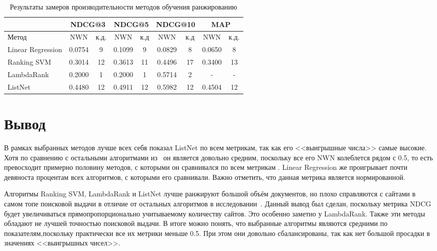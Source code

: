 \begin{table}[h]
	\begin{center}
		\begin{threeparttable}
			\captionsetup{justification=raggedright,singlelinecheck=off}
			\caption{Результаты замеров производительности методов обучения ранжированию}
			\label{tbl:measure}
			\begin{tabular}{|l|c|c|c|c|c|c|c|c|}
				\hline
				 & \multicolumn{2}{c|}{NDCG@3} & \multicolumn{2}{c|}{NDCG@5} & \multicolumn{2}{c|}{NDCG@10} & \multicolumn{2}{c|}{MAP} \\\hline
				 Метод & NWN  & к.д. & NWN  & к.д & NWN  & к.д & NWN  & к.д. \\\hline
				Linear Regression & 0.0754 & 9 & 0.1099& 9& 0.0829& 8& 0.0650& 8 \\\hline
				Ranking SVM &  0.3014 & 12& 0.3613& 11& 0.4496& 17& 0.3400& 13 \\\hline
				LambdaRank &  0.2000 &1 &0.2000 &1 &0.5714& 2 &-& - \\\hline
				ListNet &  0.4480 &12 &0.4911 &12 &0.5982 &12 &0.4504 &12 \\\hline
			\end{tabular}
		\end{threeparttable}
	\end{center}
\end{table}

\section{Вывод}

В рамках выбранных методов лучше всех себя показал ListNet по всем метрикам, так как его <<выигрышные числа>> самые высокие. Хотя по сравнению с остальными алгоритмами из~\cite{cmp} он является довольно средним, поскольку все его NWN колеблется рядом с 0.5, то есть превосходит примерно половину методов, с которыми он сравнивался по всем метрикам . Linear Regression же проигрывает почти девяноста процентам всех алгоритмов, с которыми его сравнивали. Важно отметить, что данная метрика является нормированной.

Алгоритмы Ranking SVM, LambdaRank и ListNet лучше ранжируют большой объём документов, но плохо справляются с сайтами в самом топе поисковой выдачи в отличие от остальных алгоритмов в исследовании~\cite{cmp}. Данный вывод был сделан, поскольку метрика NDCG будет увеличиваться прямопропорционально учитываемому  количеству сайтов. Это особенно заметно у  LambdaRank. Также эти методы обладают не лучшей точностью поисковой выдачи. В итоге можно понять, что выбранные алгоритмы являются средними по показателям,поскольку практически все их метрики меньше 0.5. При этом они довольно сбалансированы, так как нет большой просадки в значениях <<выигрышных чисел>>.